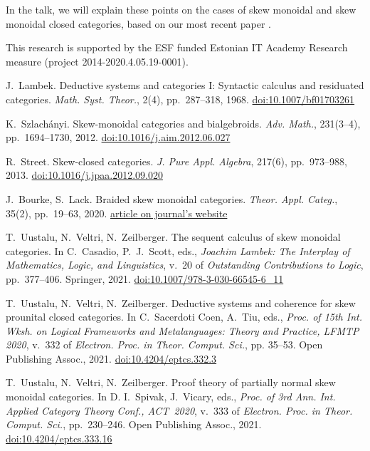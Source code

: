 \documentclass{article}
\newcommand{\doi}[1]{\href{https://doi.org/#1}{doi:#1}}
\begin{document}
In the talk, we will explain these points on the cases of skew
monoidal and skew monoidal closed categories, based on our most recent
paper \cite{UVW}.

This research is supported by the ESF funded Estonian IT Academy
Research measure (project 2014-2020.4.05.19-0001).

\small

\begin{thebibliography}{99}

 J.~Lambek. Deductive systems and categories I: Syntactic
  calculus and residuated categories. \emph{Math. Syst. Theor.}, 2(4),
  pp.~287--318, 1968.
\doi{10.1007/bf01703261}

 K.~Szlach\'anyi. Skew-monoidal categories and
  bialgebroids. \emph{Adv. Math.}, 231(3--4), pp.~1694--1730, 2012.
\doi{10.1016/j.aim.2012.06.027}

 R.~Street. Skew-closed categories. \emph{J. Pure
Appl. Algebra}, 217(6), pp.~973--988, 2013.
\doi{10.1016/j.jpaa.2012.09.020}

 J.~Bourke, S.~Lack. Braided skew monoidal categories.
\emph{Theor. Appl. Categ.}, 35(2), pp.~19--63, 2020.
\href{http://www.tac.mta.ca/tac/volumes/35/2/35-02abs.html}{article on journal's website}

 T.~Uustalu, N.~Veltri, N.~Zeilberger. The sequent
  calculus of skew monoidal categories. In C.~Casadio, P.~J.~Scott,
  eds., \emph{Joachim Lambek: The Interplay of Mathematics, Logic, and
  Linguistics}, v.~20 of \emph{Outstanding Contributions to Logic},
  pp.~377--406. Springer, 2021.
\doi{10.1007/978-3-030-66545-6\_11}

 T.~Uustalu, N.~Veltri, N.~Zeilberger. Deductive
  systems and coherence for skew prounital closed categories. \linebreak In
  C.~Sacerdoti Coen, A.~Tiu, eds., \emph{Proc. of 15th Int. Wksh. on
    Logical Frameworks and Metalanguages: Theory and Practice, LFMTP
    2020}, v.~332 of \emph{Electron. Proc. in Theor. Comput. Sci.},
  pp. 35--53. Open Publishing Assoc., 2021.
\doi{10.4204/eptcs.332.3}

 T.~Uustalu, N.~Veltri, N.~Zeilberger. Proof theory of
  partially normal skew monoidal categories. In D. I.~Spivak,
  J.~Vicary, eds., \emph{Proc. of 3rd Ann. Int. Applied Category
    Theory Conf., ACT~2020}, v.~333 of \emph{Electron. Proc. in
    Theor. Comput. Sci.}, pp.~230--246. Open Publishing Assoc., 2021.
\doi{10.4204/eptcs.333.16}


\end{thebibliography}
\end{document}
